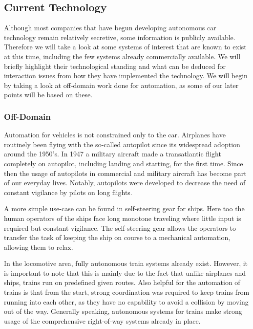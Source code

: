 \documentclass{acm_proc_article-sp}
\begin{document}
\subsection{Current Technology}
\label{current_tech}

Although most companies that have begun developing autonomous car technology remain relatively secretive, some information is publicly available.
Therefore we will take a look at some systems of interest that are known to exist at this time, including the few systems already commercially available.
We will briefly highlight their technological standing and what can be deduced for interaction issues from how they have implemented the technology.
We will begin by taking a look at off-domain work done for automation, as some of our later points will be based on these.

\subsubsection{Off-Domain}

Automation for vehicles is not constrained only to the car.
Airplanes have routinely been flying with the so-called autopilot since its widespread adoption around the 1950's.
In 1947 a military aircraft made a transatlantic flight completely on autopilot, including landing and starting, for the first time.
Since then the usage of autopilots in commercial and military aircraft has become part of our everyday lives.
Notably, autopilots were developed to decrease the need of constant vigilance by pilots on long flights.

A more simple use-case can be found in self-steering gear for ships.
Here too the human operators of the ships face long monotone traveling where little input is required but constant vigilance.
The self-steering gear allows the operators to transfer the task of keeping the ship on course to a mechanical automation, allowing them to relax.

In the locomotive area, fully autonomous train systems already exist.
However, it is important to note that this is mainly due to the fact that unlike airplanes and ships, trains run on predefined given routes.
Also helpful for the automation of trains is that from the start, strong coordination was required to keep trains from running into each other, as they have no capability to avoid a collision by moving out of the way.
Generally speaking, autonomous systems for trains make strong usage of the comprehensive right-of-way systems already in place.
\end{document}

